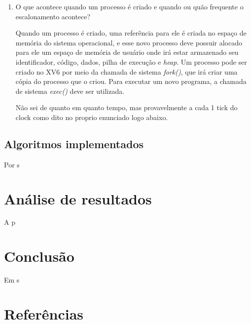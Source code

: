 \documentclass{article}
\begin{document}
\begin{enumerate}
      \item O que acontece quando um processo é criado e quando ou quão
            frequente o escalonamento acontece?

            Quando um processo é criado, uma referência para ele é
            criada no espaço de memória do sistema operacional, e esse novo
            processo deve possuir alocado para ele um espaço de memória de
            usuário onde irá
            estar armazenado seu identificador, código, dados, pilha de
            execução e \textit{heap}. Um processo pode ser criado no XV6 por
            meio da chamada de sistema \textit{fork()}, que irá criar uma cópia
            do processo que o criou. Para executar um novo programa, a chamada
            de sistema
            \textit{exec()}
            deve ser utilizada.

            Não sei de quanto em quanto tempo, mas provavelmente a cada 1 tick
            do clock como dito no proprio enunciado logo abaixo.
\end{enumerate}

\subsection{Algoritmos implementados}

Por s

\section{Análise de resultados}

A p

\section{Conclusão}

Em s

\section{Referências}
\end{document}
